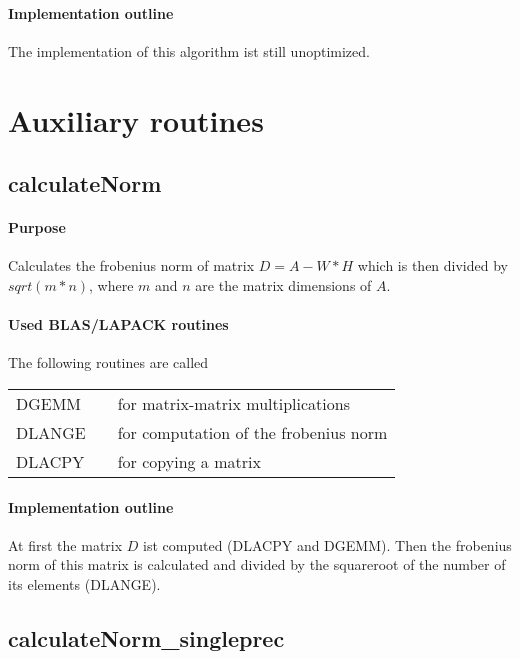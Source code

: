 \documentclass[a4paper,10pt]{scrartcl}
\begin{document}
			\paragraph{Implementation outline}


					The implementation of this algorithm ist still unoptimized.




	\section{Auxiliary routines}


		\subsection{calculateNorm}

			\paragraph{Purpose}

			Calculates the frobenius norm of matrix $ D = A-W*H$ which is then divided by $sqrt(m*n)$, 
			where $m$ and $n$ are the matrix dimensions of $A$.

			\paragraph{Used BLAS/LAPACK routines}

			The following routines are called\newline

			\begin{tabular}{lcl}
				DGEMM && for matrix-matrix multiplications\\
				DLANGE && for computation of the frobenius norm\\
				DLACPY && for copying a matrix\\
			\end{tabular}

			\paragraph{Implementation outline}

			At first the matrix $D$ ist computed (DLACPY and DGEMM). Then the frobenius norm of this
			matrix is calculated and divided by the squareroot of the number of its elements (DLANGE).


		\subsection{calculateNorm\_singleprec}
\end{document}
